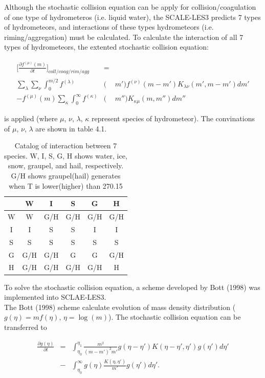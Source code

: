 Although the stochastic collision equation can be apply for collision/coagulation of one type of hydrometeros (i.e. liquid water), the SCALE-LES3 predicts 7 types of hydrometeors, and interactions of these types hydrometeors (i.e. riming/aggregation) must be calculated. To calculate the interaction of all 7 types of hydrometeors, the extented stochastic collision equation: 

\begin{eqnarray}
\Bigr[\frac{\partial f^{(\mu)}(m)}{\partial t}\Bigr]_{coll/coag/rim/agg}&=&\nonumber\\
\sum_{\lambda}\sum_{\nu}\int_{0}^{m/2}f^{(\lambda)}&(&m')f^{(\nu)}(m-m')K_{\lambda\nu}(m',m-m')dm' \nonumber\\
-f^{(\mu)}(m)\sum_{\kappa}\int_0^{\infty}f^{(\kappa)}&(&m'')K_{\kappa\mu}(m,m'')dm''
\end{eqnarray}

is applied (where $\mu$, $\nu$, $\lambda$, $\kappa$ represent species of hydrometeor). The convinations of $\mu$, $\nu$, $\lambda$ are shown in table 4.1.

\begin{table}[h]
\begin{center}
\caption{Catalog of interaction between 7 species. W, I, S, G, H shows water, ice, snow, graupel, and hail, respectively. G/H shows graupel(hail) generates when T is lower(higher) than 270.15}
\begin{tabular}{cccccc}
\hline
     & W   & I   & S   & G   & H   \\ \hline\hline
W    & W   & G/H & G/H & G/H & G/H \\ \hline
I    & I   & S   & S   & I   & I   \\ \hline
S    & S   & S   & S   & S   & S   \\ \hline
G    & G/H & G/H & G   & G   & G/H \\ \hline
H    & G/H & G/H & G/H & G/H & H   \\ \hline
\end{tabular}
\end{center}
\end{table}


To solve the stochastic collision equation, a scheme developed by Bott (1998) was implemented into SCLAE-LES3.\\ 
The Bott (1998) scheme calculate evolution of mass density distribution ($g(\eta)=mf(\eta)$, $\eta=\log(m)$). The stochastic collision equation can be transferred to 

\begin{eqnarray}
\frac{\partial g(\eta)}{\partial t}&=&\int_{\eta_{0}}^{\eta_{1}}\frac{m^{2}}{(m-m')^{2} m'}g(\eta-\eta') K(\eta-\eta',\eta')g(\eta')d\eta' \nonumber\\
&-&\int_{\eta_{0}}^{\infty} g(\eta)\frac{K(\eta,\eta')}{m'}g(\eta')d\eta'.
\end{eqnarray}

